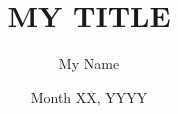 \documentclass{biosmasters}
\author{My Name}
\title{MY TITLE}
\date{Month XX, YYYY}
\begin{document}
\makeatletter
\patchcmd{\BR@backref}{\newblock}{\newblock[}{}{}
\patchcmd{\BR@backref}{\par}{]\par}{}{}
\makeatother

%
\end{document}
